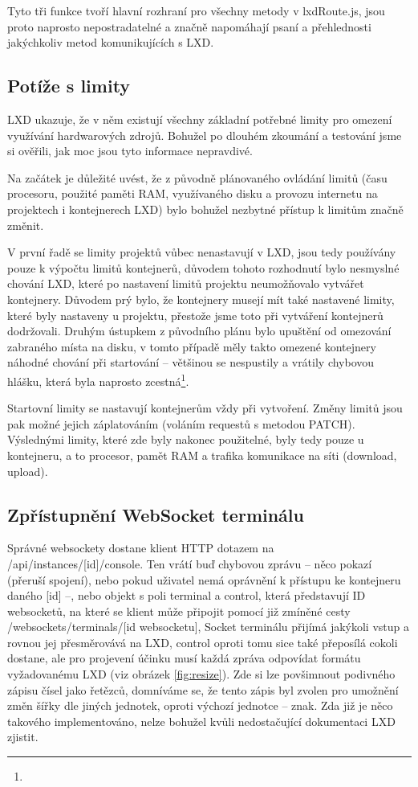 \documentclass[a4paper,oneside,12pt]{report}
\begin{document}
Tyto tři funkce tvoří hlavní rozhraní pro všechny metody v lxdRoute.js, jsou proto naprosto nepostradatelné a značně napomáhají psaní a přehlednosti jakýchkoliv metod komunikujících s LXD.

\subsection{Potíže s limity}
LXD ukazuje, že v něm existují všechny základní potřebné limity pro omezení využívání hardwarových zdrojů.
Bohužel po dlouhém zkoumání a testování jsme si ověřili, jak moc jsou tyto informace nepravdivé.

Na začátek je důležité uvést, že z původně plánovaného ovládání limitů (času procesoru, použité paměti RAM, využívaného disku a provozu internetu na projektech i kontejnerech LXD) bylo bohužel nezbytné přístup k limitům značně změnit.

V první řadě se limity projektů vůbec nenastavují v LXD, jsou tedy používány pouze k výpočtu limitů kontejnerů, důvodem tohoto rozhodnutí bylo nesmyslné chování LXD, které po nastavení limitů projektu neumožňovalo vytvářet kontejnery. Důvodem prý bylo, že kontejnery musejí mít také nastavené limity, které byly nastaveny u projektu, přestože jsme toto při vytváření kontejnerů dodržovali.
Druhým ústupkem z původního plánu bylo upuštění od omezování zabraného místa na disku, v tomto případě měly takto omezené kontejnery náhodné chování při startování – většinou se nespustily a vrátily chybovou hlášku, která byla naprosto zcestná\footnote{}.

Startovní limity se nastavují kontejnerům vždy při vytvoření. Změny limitů jsou pak možné jejich záplatováním (voláním requestů s metodou PATCH). Výslednými limity, které zde byly nakonec použitelné, byly tedy pouze u kontejneru, a to procesor, pamět RAM a trafika komunikace na síti (download, upload).

\subsection{Zpřístupnění WebSocket terminálu}

Správné websockety dostane klient HTTP dotazem na /api/instances/[id]/console. Ten vrátí buď chybovou zprávu – něco pokazí (přeruší spojení), nebo pokud uživatel nemá oprávnění k přístupu ke kontejneru daného [id] –, nebo objekt s poli terminal a control, která představují ID websocketů, na které se klient může připojit pomocí již zmíněné cesty /websockets/terminals/[id websocketu], Socket terminálu přijímá jakýkoli vstup a rovnou jej přesměrovává na LXD, control oproti tomu sice také přeposílá cokoli dostane, ale pro projevení účinku musí každá zpráva odpovídat formátu vyžadovanému LXD (viz obrázek \ref{fig:resize}). Zde si lze povšimnout podivného zápisu čísel jako řetězců, domníváme se, že tento zápis byl zvolen pro umožnění změn šířky dle jiných jednotek, oproti výchozí jednotce – znak. Zda již je něco takového implementováno, nelze bohužel kvůli nedostačující dokumentaci LXD zjistit.
\end{document}

